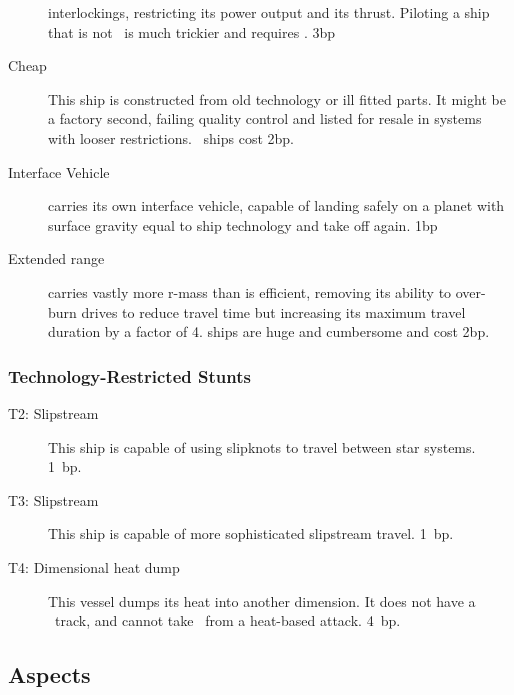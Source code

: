 \begin{description}
interlockings, restricting its power output and its thrust. Piloting a ship
that is not \Civilian\ is much trickier and requires . 3bp
\item[Cheap]
This ship is constructed from old technology or ill fitted
parts. It might be a factory second, failing quality control and
listed for resale in systems with looser restrictions. \Cheap\ ships
cost 2bp.
\item[Interface Vehicle]
carries its own interface vehicle, capable of landing safely on a planet with
surface gravity equal to ship technology and take off again. 1bp
\item[Extended range]
carries vastly more r-mass than is efficient, removing its ability to
over-burn drives to reduce travel time but increasing its maximum travel
duration by a factor of 4.  ships are huge and cumbersome and
cost 2bp.
\end{description}

\subsubsection{Technology-Restricted Stunts}\label{sec:spacecraft-technology-restricted-stunts}
\begin{description}
\item[T2: Slipstream]
This ship is capable of using slipknots to travel between star systems. 1~bp.

\item[T3: Slipstream]
This ship is capable of more sophisticated slipstream travel. 1~bp.

\item[T4: Dimensional heat dump]
This vessel dumps its heat into another dimension. It does not have a \Heat\ track, and cannot take \Consequences\ from a heat-based attack. 4~bp.
\end{description}

\subsection{Aspects}\label{sec:spacecraft-aspects} %

